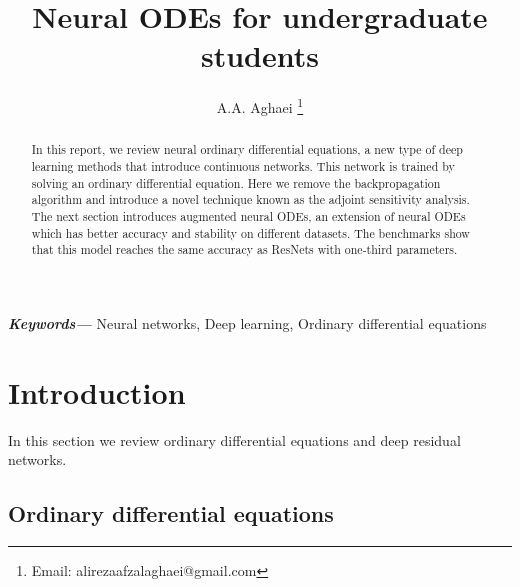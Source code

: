 \documentclass{article}
\providecommand{\keywords}[1]
{
	\small	
	\textbf{\textit{Keywords---}} #1
}
\begin{document}
	\title{Neural ODEs for undergraduate students}
	\author{A.A. Aghaei \thanks{Email: alirezaafzalaghaei@gmail.com}}
	\maketitle	
	\begin{abstract}
		In this report, we review neural ordinary differential equations, a new type of deep learning methods that introduce continuous networks. This network is trained by solving an ordinary differential equation. Here we remove the backpropagation algorithm and introduce a novel technique known as the adjoint sensitivity analysis. The next section introduces augmented neural ODEs, an extension of neural ODEs which has better accuracy and stability on different datasets. The benchmarks show that this model reaches the same accuracy as ResNets with one-third parameters.  
	\end{abstract}
	
	\keywords{Neural networks, Deep learning, Ordinary differential equations}
	
	
	\section{Introduction}
	In this section we review ordinary differential equations and deep residual networks. 
	\subsection{Ordinary differential equations}
	
\end{document}
